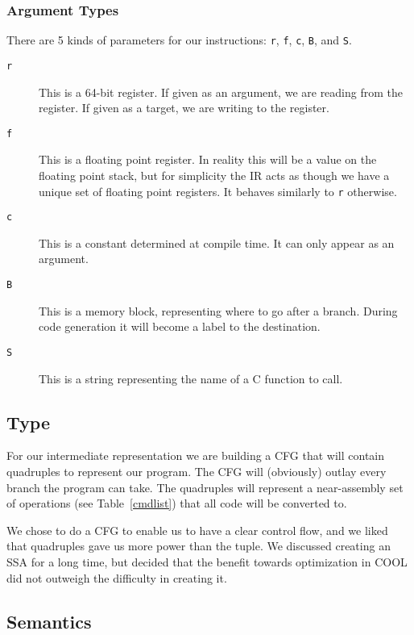 \documentclass[10pt, onecolumn]{extarticle}
\begin{document}
\subsubsection{Argument Types}
\label{argtypes}
There are 5 kinds of parameters for our instructions: \texttt{r}, \texttt{f}, \texttt{c}, \texttt{B}, and \texttt{S}.

\begin{description}
  \item[\texttt{r}] This is a 64-bit register. If given as an argument, we are reading from the register. If given
    as a target, we are writing to the register.
  \item[\texttt{f}] This is a floating point register. In reality this will be a value on the floating point stack,
    but for simplicity the IR acts as though we have a unique set of floating point registers. It behaves similarly
    to \texttt{r} otherwise.
  \item[\texttt{c}] This is a constant determined at compile time. It can only appear as an argument.
  \item[\texttt{B}] This is a memory block, representing where to go after a branch. During code generation it will
    become a label to the destination.
  \item[\texttt{S}] This is a string representing the name of a C function to call.
\end{description}

\subsection{Type}
For our intermediate representation we are building a CFG that will contain quadruples to represent our program. The CFG will (obviously) outlay every branch the program can take. The quadruples will represent a near-assembly set of operations (see Table~\ref{cmdlist}) that all code will be converted to.

We chose to do a CFG to enable us to have a clear control flow, and we liked that quadruples gave us more power than the tuple. We discussed creating an SSA for a long time, but decided that the benefit towards optimization in COOL did not outweigh the difficulty in creating it. 

\subsection{Semantics}
\end{document}
